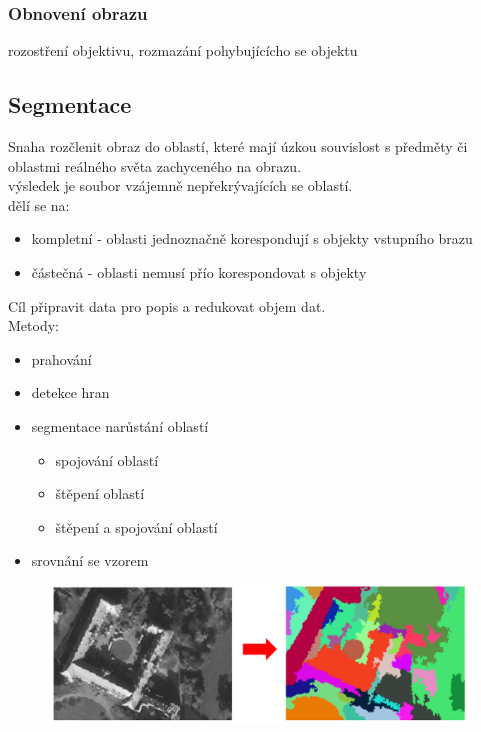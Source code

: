 \subsubsection*{Obnovení obrazu}
rozostření objektivu, rozmazání pohybujícícho se objektu\\

\subsection*{Segmentace}
Snaha rozčlenit obraz do oblastí, které mají úzkou souvislost s předměty či oblastmi reálného světa zachyceného na obrazu.\\
výsledek je soubor vzájemně nepřekrývajících se oblastí.\\
dělí se na:
\begin{itemize}
    \item kompletní - oblasti jednoznačně korespondují s objekty vstupního brazu
    \item částečná - oblasti nemusí přío korespondovat s objekty
\end{itemize}
Cíl připravit data pro popis a redukovat objem dat.\\
Metody:
\begin{itemize}
    \item prahování
    \item detekce hran
    \item segmentace narůstání oblastí
    \begin{itemize}
        \item spojování oblastí
        \item štěpení oblastí
        \item štěpení a spojování oblastí
    \end{itemize}
    \item srovnání se vzorem
\end{itemize}
\begin{figure}[H]
    \includegraphics[scale = 0.3]{images/segmentace.png}
\end{figure}

